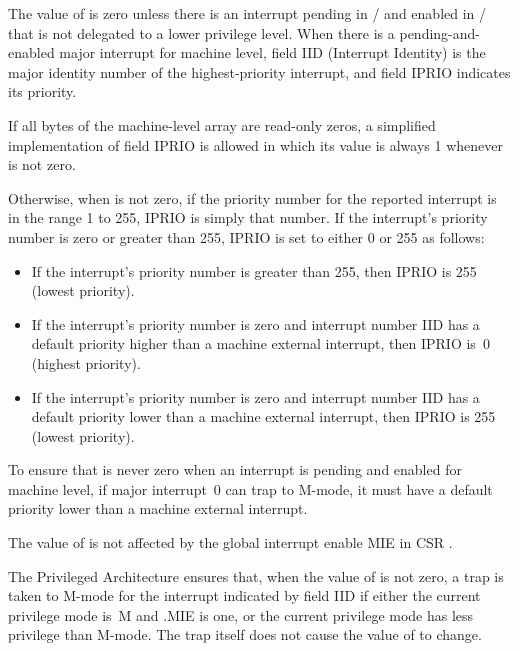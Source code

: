 The value of  is zero unless there is an interrupt pending in
/ and enabled in / that is not delegated
to a lower privilege level.
When there is a pending-and-enabled major interrupt for machine
level, field IID (Interrupt Identity) is the major identity number of
the highest-priority interrupt, and field IPRIO indicates its priority.

If all bytes of the machine-level  array are read-only zeros,
a simplified implementation of field IPRIO is allowed in which its
value is always 1 whenever  is not zero.

Otherwise, when  is not zero, if the priority number for the reported
interrupt is in the range 1 to 255, IPRIO is simply that number.
If the interrupt's priority number is zero or greater than 255,
IPRIO is set to either 0 or 255 as follows:
\begin{itemize}

\item
If the interrupt's priority number is greater than 255, then
IPRIO is 255 (lowest priority).

\item
If the interrupt's priority number is zero and interrupt number IID has
a default priority higher than a machine external interrupt, then IPRIO
is~0 (highest priority).

\item
If the interrupt's priority number is zero and interrupt number IID has
a default priority lower than a machine external interrupt, then IPRIO
is 255 (lowest priority).

\end{itemize}

\begin{commentary}
To ensure that  is never zero when an interrupt is pending
and enabled for machine level, if major interrupt~0 can trap to
\hbox{M-mode}, it must have a default priority lower than a machine
external interrupt.
\end{commentary}

The value of  is not affected by
the global interrupt enable MIE in CSR .

The {\RISCV} Privileged Architecture ensures that, when the value
of  is not zero, a trap is taken to \mbox{M-mode} for the
interrupt indicated by field IID if either the current privilege
mode is~M and .MIE is one, or the current
privilege mode has less privilege than \mbox{M-mode}.
The trap itself does not cause the value of  to change.

